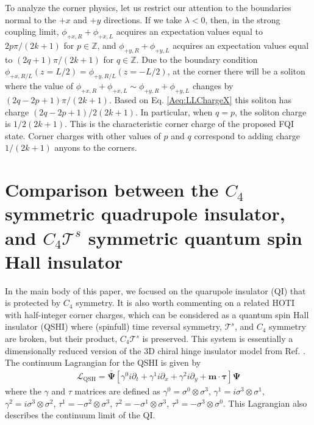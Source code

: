 \documentclass[%
 reprint,
 amsmath,amssymb,
 aps,
]{revtex4-1}
\begin{document}
\begin{appendix}
To analyze the corner physics, let us restrict our attention to the boundaries normal to the $+x$ and $+y$ directions. If we take $\lambda<0$, then, in the strong coupling limit, $\phi_{+ x,R}+\phi_{+ x,L}$ acquires an expectation values equal to $2p\pi /(2k+1)$ for $p\in \mathbb{Z}$, and $\phi_{+y,R}+\phi_{+y,L}$ acquires an expectation values equal to $(2q+1)\pi /(2k+1)$ for $q\in \mathbb{Z}$. Due to the boundary condition $ \phi_{+x,R/L}(z = L/2) = \phi_{+y,R/L}(z = -L/2)$, at the corner there will be a soliton where the value of  $\phi_{+ x,R}+\phi_{+ x,L} \sim \phi_{+y,R}+\phi_{+y,L} $ changes by $(2q-2p+1)\pi /(2k+1)$. Based on Eq. \ref{Aeq:LLChargeX} this soliton has charge $(2q-2p+1) /2(2k+1)$. In particular, when $q = p$, the soliton charge is $1 /2(2k+1)$. This is the characteristic corner charge of the proposed FQI state. Corner charges with other values of $p$ and $q$ correspond to adding charge $1/(2k+1)$ anyons to the corners.


\section{Comparison between the $C_4$ symmetric quadrupole insulator, and $C_4\mathcal{T}^s$ symmetric quantum spin Hall insulator}\label{app:QSHComp}

In the main body of this paper, we focused on the quarupole insulator (QI) that is protected by $C_4$ symmetry. It is also worth commenting on a related HOTI with half-integer corner charges, which can be considered as a quantum spin Hall insulator (QSHI) where (spinfull) time reversal symmetry, $\mathcal{T}^{s}$, and $C_4$ symmetry are broken, but their product, $C_4\mathcal{T}^s$ is preserved. This system is essentially a dimensionally reduced version of the 3D chiral hinge insulator model from Ref. \cite{schindler2018higher}. The continuum Lagrangian for the QSHI is given by\cite{qi2008topological}
\begin{equation}\begin{split}
\mathcal{L}_{\text{QSH}} = \bar{\bm{\Psi}} [\gamma^0 i\partial_t + \gamma^1 i\partial_x + \gamma^2 i\partial_y + \bm{m}\cdot \bm{\tau}] \bm{\Psi}
\label{Aeq:QSHContinuumLag}\end{split}\end{equation}
where the $\gamma$ and $\tau$ matrices are defined as $\gamma^0 = \sigma^0 \otimes \sigma^3$, $\gamma^1 = i \sigma^3 \otimes \sigma^1$, $\gamma^2 = i \sigma^3 \otimes \sigma^2$, $\tau^1 = -\sigma^2\otimes \sigma^3$, $\tau^2 = -\sigma^1\otimes \sigma^3$, $\tau^3 = -\sigma^3\otimes \sigma^0$. This Lagrangian also describes the continuum limit of the QI. 


\end{appendix}
\end{document}
